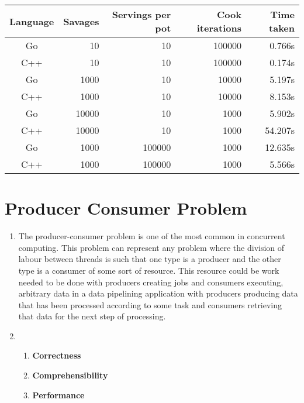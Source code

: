 \documentclass[11pt]{article}
\begin{document}
\begin{tabular}{c r r r r}
Language    & Savages & Servings per pot & Cook iterations & Time taken \\
\toprule
Go 			& 10 & 10 & 100000 & 0.766s \\
C++         & 10 & 10 & 100000 & 0.174s \\
\cmidrule{1-5}
Go 			& 1000 & 10 & 10000 & 5.197s \\
C++         & 1000 & 10 & 10000 & 8.153s \\
\cmidrule{1-5}
Go 			& 10000 & 10 & 1000 & 5.902s \\
C++         & 10000 & 10 & 1000 & 54.207s \\
\cmidrule{1-5}
Go 			& 1000 & 100000 & 1000 & 12.635s \\
C++         & 1000 & 100000 & 1000 & 5.566s \\
\end{tabular}

\pagebreak

\section{Producer Consumer Problem}
\begin{enumerate}
	\item The producer-consumer problem is one of the most common in concurrent computing. This problem can represent any problem where the division of labour between threads is such that one type is a producer and the other type is a consumer of some sort of resource. This resource could be work needed to be done with producers creating jobs and consumers executing, arbitrary data in a data pipelining application with producers producing data that has been processed according to some task and consumers retrieving that data for the next step of processing. 

	\item
	\begin{enumerate}
	\item \textbf{Correctness}\linebreak
	
	\item \textbf{Comprehensibility}\linebreak
	
	\item \textbf{Performance}\linebreak
	
	\end{enumerate}	
\end{enumerate}
\end{document}
